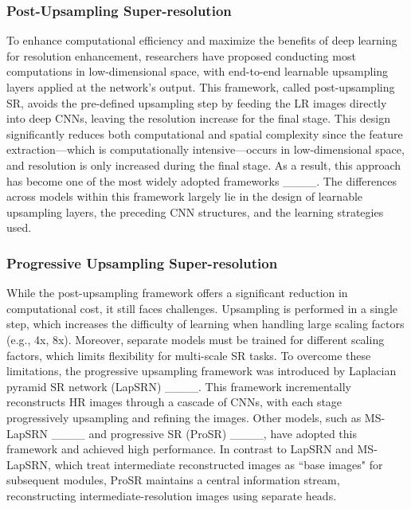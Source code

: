 \subsubsection{Post-Upsampling Super-resolution}
To enhance computational efficiency and maximize the benefits of deep learning for resolution enhancement, researchers have proposed conducting most computations in low-dimensional space, with end-to-end learnable upsampling layers applied at the network’s output. This framework, called post-upsampling SR, avoids the pre-defined upsampling step by feeding the LR images directly into deep CNNs, leaving the resolution increase for the final stage. This design significantly reduces both computational and spatial complexity since the feature extraction—which is computationally intensive—occurs in low-dimensional space, and resolution is only increased during the final stage. As a result, this approach has become one of the most widely adopted frameworks ____. The differences across models within this framework largely lie in the design of learnable upsampling layers, the preceding CNN structures, and the learning strategies used.
\subsubsection{Progressive Upsampling Super-resolution}
While the post-upsampling framework offers a significant reduction in computational cost, it still faces challenges. Upsampling is performed in a single step, which increases the difficulty of learning when handling large scaling factors (e.g., 4x, 8x). Moreover, separate models must be trained for different scaling factors, which limits flexibility for multi-scale SR tasks. To overcome these limitations, the progressive upsampling framework was introduced by Laplacian pyramid SR network (LapSRN) ____. This framework incrementally reconstructs HR images through a cascade of CNNs, with each stage progressively upsampling and refining the images. Other models, such as MS-LapSRN ____ and progressive SR (ProSR) ____, have adopted this framework and achieved high performance. In contrast to LapSRN and MS-LapSRN, which treat intermediate reconstructed images as ``base images" for subsequent modules, ProSR maintains a central information stream, reconstructing intermediate-resolution images using separate heads.

